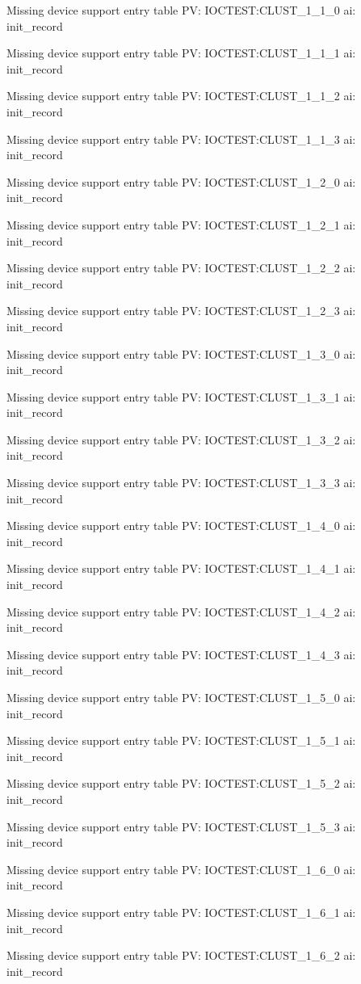 Missing device support entry table PV: IOCTEST:CLUST_1_1_0 ai: init_record

Missing device support entry table PV: IOCTEST:CLUST_1_1_1 ai: init_record

Missing device support entry table PV: IOCTEST:CLUST_1_1_2 ai: init_record

Missing device support entry table PV: IOCTEST:CLUST_1_1_3 ai: init_record

Missing device support entry table PV: IOCTEST:CLUST_1_2_0 ai: init_record

Missing device support entry table PV: IOCTEST:CLUST_1_2_1 ai: init_record

Missing device support entry table PV: IOCTEST:CLUST_1_2_2 ai: init_record

Missing device support entry table PV: IOCTEST:CLUST_1_2_3 ai: init_record

Missing device support entry table PV: IOCTEST:CLUST_1_3_0 ai: init_record

Missing device support entry table PV: IOCTEST:CLUST_1_3_1 ai: init_record

Missing device support entry table PV: IOCTEST:CLUST_1_3_2 ai: init_record

Missing device support entry table PV: IOCTEST:CLUST_1_3_3 ai: init_record

Missing device support entry table PV: IOCTEST:CLUST_1_4_0 ai: init_record

Missing device support entry table PV: IOCTEST:CLUST_1_4_1 ai: init_record

Missing device support entry table PV: IOCTEST:CLUST_1_4_2 ai: init_record

Missing device support entry table PV: IOCTEST:CLUST_1_4_3 ai: init_record

Missing device support entry table PV: IOCTEST:CLUST_1_5_0 ai: init_record

Missing device support entry table PV: IOCTEST:CLUST_1_5_1 ai: init_record

Missing device support entry table PV: IOCTEST:CLUST_1_5_2 ai: init_record

Missing device support entry table PV: IOCTEST:CLUST_1_5_3 ai: init_record

Missing device support entry table PV: IOCTEST:CLUST_1_6_0 ai: init_record

Missing device support entry table PV: IOCTEST:CLUST_1_6_1 ai: init_record

Missing device support entry table PV: IOCTEST:CLUST_1_6_2 ai: init_record

